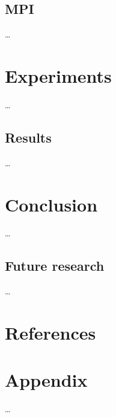 \documentclass{article}
\begin{document}
\subsection{MPI}\label{sec:mpi}
\ldots

\section{Experiments}\label{sec:experiments}
\ldots

\subsection{Results}\label{sec:results}
\ldots

\section{Conclusion}\label{sec:conclusion}
\ldots

\subsection{Future research}\label{sec:future-research}
\ldots

\section*{References}\label{sec:references}
\printbibliography[heading=none]

\section*{Appendix}
\ldots
\end{document}
